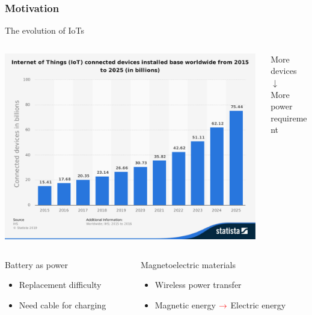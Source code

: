 \documentclass[compress]{beamer}
\begin{document}
\begin{frame}\frametitle{Motivation}
\vspace{-12.5pt}
The evolution of IoTs \\
\begin{columns}[totalwidth=\textwidth] 
   \begin{column}{.75\textwidth} 
   \includegraphics[width=0.99\textwidth]{Graphic/01_iotnumber.pdf}
   \end{column}
   \begin{column}{.24\textwidth}
   \centering
   More devices \\ [0.2cm]
   {\color{red} \Huge$\mathbf{\downarrow}$} \\ [0.2cm]
    More power requirement \\ [0.2cm]
   \end{column}
\end{columns}
\begin{columns}[totalwidth=\textwidth] 
   \begin{column}{.40\textwidth} 
   \begin{alertblock}{Battery as power}
	\begin{itemize}[label=$\boxed{\color{red} \times}$, font=\small, leftmargin=*]
	\item Replacement difficulty
	\item Need cable for charging
	\end{itemize}
	\end{alertblock}
   \end{column}
   \begin{column}{.56\textwidth}
       \begin{exampleblock}{Magnetoelectric materials}
	\begin{itemize}[label=$\boxed{\color{green} \checkmark}$, font=\small, leftmargin=*]
	\item Wireless power transfer
	\item Magnetic energy ${\color{red} \rightarrow}$ Electric energy
	\end{itemize}
	\end{exampleblock}
   \end{column}
\end{columns}
\end{frame}
\end{document}
